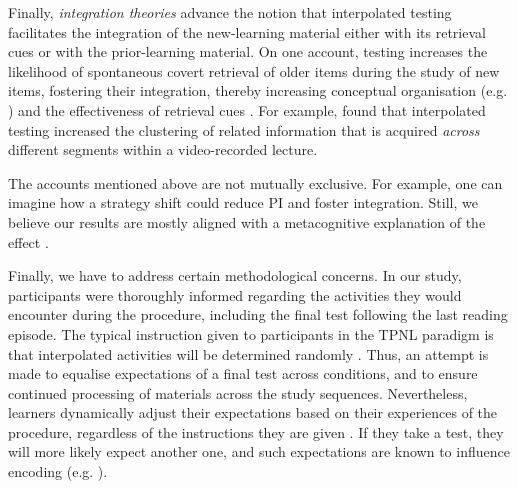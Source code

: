 \documentclass[../main.tex]{subfiles}
\begin{document}
Finally, \textit{integration theories} advance the notion that interpolated 
testing facilitates the integration of the new-learning material either with 
its retrieval cues or with the prior-learning material. On one account, 
testing increases the likelihood of spontaneous covert retrieval of 
older items during the study of new items, fostering their 
integration, thereby increasing conceptual organisation (e.g. 
\citealp{jingInterpolatedTestingInfluences2016}) and the effectiveness of 
retrieval cues \citep{pycWhyTestingImproves2010}. For example, 
\cite{jingInterpolatedTestingInfluences2016} found that interpolated testing 
increased the clustering of related information that is acquired 
\textit{across} different segments within a video-recorded lecture.

The accounts mentioned above are not mutually exclusive. For example, one 
can imagine how a strategy shift could reduce PI and foster integration. 
Still, we believe our results are mostly aligned with a metacognitive 
explanation of the effect \citep{wissmanInterimTestEffect2011, 
chanTestingPotentiatesNew2018}. 

Finally, we have to address certain methodological concerns.  In our study, 
participants were thoroughly informed regarding the activities they would 
encounter during the procedure, including the final test following the last 
reading episode. The typical instruction given to participants in the TPNL 
paradigm is that interpolated activities will be determined randomly
\citep{yangEnhancingLearningRetrieval2018}. Thus, an attempt is made to 
equalise expectations of a final test across conditions, and to ensure 
continued processing of materials across the study sequences. Nevertheless, 
learners dynamically adjust their expectations based on their experiences of 
the procedure, regardless of the instructions they are given 
\citep{weinsteinRoleTestExpectancy2014}.  If they take a test, they will 
more likely expect another one, and such expectations are known to influence 
encoding (e.g. \citealp{szpunarExpectationFinalCumulative2007}). 
\end{document}

